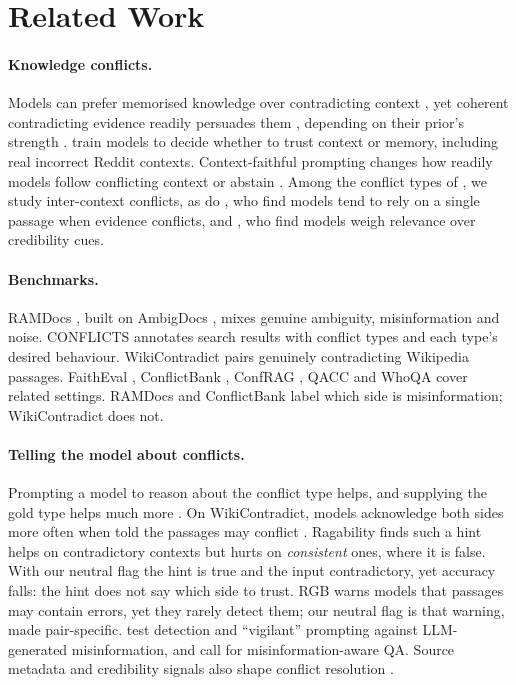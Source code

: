 \section{Related Work}
\label{sec:related}

\paragraph{Knowledge conflicts.}
Models can prefer memorised knowledge over contradicting context \citep{longpre2021entity}, yet coherent contradicting evidence
readily persuades them \citep{xie2024chameleon}, depending on their prior's strength \citep{wu2024clasheval}. \citet{huang2025trust} train models to decide whether to trust context or memory,
including real incorrect Reddit contexts. Context-faithful prompting changes how readily models follow
conflicting context or abstain \citep{zhou2023context}. Among the conflict types of \citet{xu2024survey}, we study inter-context
conflicts, as do \citet{chen2022rich}, who find models tend to rely on a single passage when evidence conflicts,
and \citet{wan2024convincing}, who find models weigh relevance over credibility cues.

\paragraph{Benchmarks.}
RAMDocs \citep{wang2025madam}, built on AmbigDocs \citep{lee2024ambigdocs}, mixes genuine ambiguity, misinformation
and noise. CONFLICTS \citep{cattan2025conflicts} annotates search results with conflict types and each type's
desired behaviour. WikiContradict \citep{hou2024wikicontradict} pairs genuinely contradicting Wikipedia passages.
FaithEval \citep{ming2025faitheval}, ConflictBank \citep{su2024conflictbank}, ConfRAG \citep{yuan2026confrag},
QACC \citep{liu2025qacc} and WhoQA \citep{pham2024whoqa} cover related settings. RAMDocs and ConflictBank label which side is misinformation; WikiContradict does not.

\paragraph{Telling the model about conflicts.}
Prompting a model to reason about the conflict type helps, and supplying the gold type helps much more
\citep{cattan2025conflicts}. On WikiContradict, models acknowledge both sides more often when told the passages may
conflict \citep{hou2024wikicontradict}. Ragability \citep{gross2026ragability} finds such a hint helps on
contradictory contexts but hurts on \emph{consistent} ones, where it is false. With our neutral flag the hint is
true and the input contradictory, yet accuracy falls: the hint does not say which side to trust.
RGB \citep{chen2024rgb} warns models that passages may contain errors, yet they rarely
detect them; our neutral flag is that warning, made pair-specific.
\citet{pan2023risk} test detection and ``vigilant'' prompting against LLM-generated misinformation, and
\citet{pan2023attacking} call for misinformation-aware QA. Source metadata and credibility signals also shape conflict resolution
\citep{chiang2024metadata,ge2025confact}.

